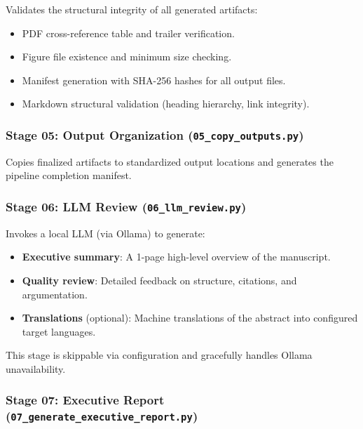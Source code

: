 \documentclass[
]{article}
\providecommand{\tightlist}{%
  \setlength{\itemsep}{0pt}\setlength{\parskip}{0pt}}
\begin{document}
Validates the structural integrity of all generated artifacts:

\begin{itemize}
\tightlist
\item
  PDF cross-reference table and trailer verification.
\item
  Figure file existence and minimum size checking.
\item
  Manifest generation with SHA-256 hashes for all output files.
\item
  Markdown structural validation (heading hierarchy, link integrity).
\end{itemize}

\subsubsection{\texorpdfstring{Stage 05: Output Organization
(\texttt{05\_copy\_outputs.py})}{Stage 05: Output Organization (05\_copy\_outputs.py)}}\label{stage-05-output-organization-05_copy_outputs.py}

Copies finalized artifacts to standardized output locations and
generates the pipeline completion manifest.

\subsubsection{\texorpdfstring{Stage 06: LLM Review
(\texttt{06\_llm\_review.py})}{Stage 06: LLM Review (06\_llm\_review.py)}}\label{stage-06-llm-review-06_llm_review.py}

Invokes a local LLM (via Ollama) to generate:

\begin{itemize}
\tightlist
\item
  \textbf{Executive summary}: A 1-page high-level overview of the
  manuscript.
\item
  \textbf{Quality review}: Detailed feedback on structure, citations,
  and argumentation.
\item
  \textbf{Translations} (optional): Machine translations of the abstract
  into configured target languages.
\end{itemize}

This stage is skippable via configuration and gracefully handles Ollama
unavailability.

\subsubsection{\texorpdfstring{Stage 07: Executive Report
(\texttt{07\_generate\_executive\_report.py})}{Stage 07: Executive Report (07\_generate\_executive\_report.py)}}\label{stage-07-executive-report-07_generate_executive_report.py}
\end{document}

